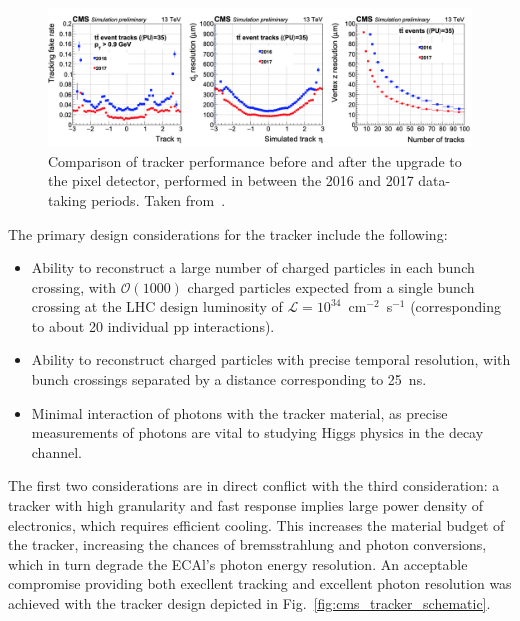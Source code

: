 \begin{figure} [htbp!]
    \centering
    \includegraphics[width=\linewidth]{figures/cms/cms_pixel_upgrade.png}
    \caption{Comparison of tracker performance before and after the upgrade to the pixel detector, performed in between the 2016 and 2017 data-taking periods. Taken from~\cite{Botta:2285433}.}
    \label{fig:cms_tracker_upgrade}
\end{figure}

The primary design considerations for the tracker include the following:
\begin{itemize}
    \item Ability to reconstruct a large number of charged particles in each bunch crossing, with $\mathcal O(1000)$ charged particles expected from a single bunch crossing at the LHC design luminosity of $\mathcal L = 10^{34}$~cm$^{-2}$~s$^{-1}$ (corresponding to about 20 individual pp interactions).
    \item Ability to reconstruct charged particles with precise temporal resolution, with bunch crossings separated by a distance corresponding to 25~ns.
    \item Minimal interaction of photons with the tracker material, as precise measurements of photons are vital to studying Higgs physics in the \Hgg decay channel.
\end{itemize}

The first two considerations are in direct conflict with the third consideration: a tracker with high granularity and fast response implies large power density of electronics, which requires efficient cooling. This increases the material budget of the tracker, increasing the chances of bremsstrahlung and photon conversions, which in turn degrade the ECAl's photon energy resolution. 
An acceptable compromise providing both execllent tracking and excellent photon resolution was achieved with the tracker design depicted in Fig.~\ref{fig:cms_tracker_schematic}.

